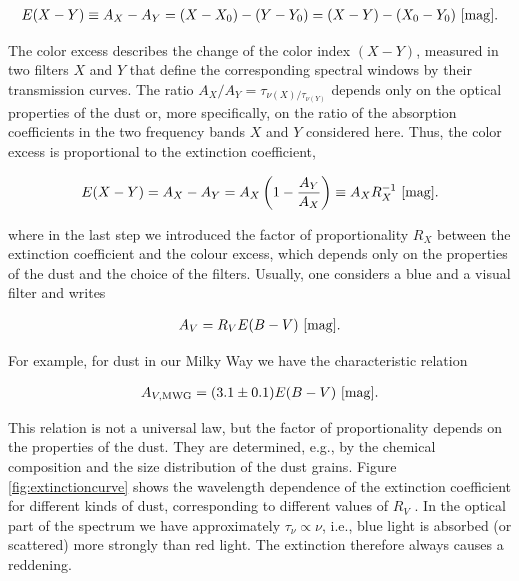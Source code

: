 \documentclass[a4paper,10pt]{article}
\begin{document}
\begin{align*}
    E(X-Y) \equiv A_X-A_Y = (X-X_0)-(Y-Y_0) = (X-Y)-(X_0-Y_0) ~ [{\rm mag}].
\end{align*}

{\noindent}The color excess describes the change of the color index $(X-Y)$, measured in two filters $X$ and $Y$ that define the corresponding spectral windows by their transmission curves. The ratio $A_X/A_Y=\tau_{\nu(X)/\tau_{\nu(Y)}}$ depends only on the optical properties of the dust or, more specifically, on the ratio of the absorption coefficients in the two frequency bands $X$ and $Y$ considered here. Thus, the color excess is proportional to the extinction coefficient,

\begin{align*}
    E(X-Y) = A_X-A_Y = A_X\left(1-\frac{A_Y}{A_X}\right) \equiv A_XR_X^{-1} ~ [{\rm mag}].
\end{align*}

{\noindent}where in the last step we introduced the factor of proportionality $R_X$ between the extinction coefficient and the colour excess, which depends only on the properties of the dust and the choice of the filters. Usually, one considers a blue and a visual filter and writes

\begin{align*}
    A_V = R_V E(B-V) ~ [{\rm mag}].
\end{align*}

{\noindent}For example, for dust in our Milky Way we have the characteristic relation

\begin{align*}
    A_{V,\mathrm{MWG}} = (3.1\pm0.1)E(B-V) ~ [{\rm mag}].
\end{align*}

{\noindent}This relation is not a universal law, but the factor of proportionality depends on the properties of the dust. They are determined, e.g., by the chemical composition and the size distribution of the dust grains. Figure \ref{fig:extinctioncurve} shows the wavelength dependence of the extinction coefficient for different kinds of dust, corresponding to different values of $R_V$ . In the optical part of the spectrum we have approximately $\tau_\nu\propto\nu$, i.e., blue light is absorbed (or scattered) more strongly than red light. The extinction therefore always causes a reddening.
\end{document}
